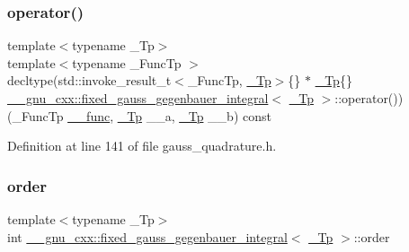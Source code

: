 \mbox{\label{struct____gnu__cxx_1_1fixed__gauss__gegenbauer__integral_a16f67fec7b9c704fa11076db362ca938}} 
\subsubsection{\texorpdfstring{operator()}{operator()}}
{\footnotesize\ttfamily template$<$typename \+\_\+\+Tp$>$ \\
template$<$typename \+\_\+\+Func\+Tp $>$ \\
decltype(std\+::invoke\+\_\+result\+\_\+t$<$\+\_\+\+Func\+Tp, \hyperlink{namespace____gnu__cxx_a3b19a9c800ca194374ef9172290f7d79}{\+\_\+\+Tp}$>$\{\} $\ast$ \hyperlink{namespace____gnu__cxx_a3b19a9c800ca194374ef9172290f7d79}{\+\_\+\+Tp}\{\} \hyperlink{struct____gnu__cxx_1_1fixed__gauss__gegenbauer__integral}{\+\_\+\+\_\+gnu\+\_\+cxx\+::fixed\+\_\+gauss\+\_\+gegenbauer\+\_\+integral}$<$ \hyperlink{namespace____gnu__cxx_a3b19a9c800ca194374ef9172290f7d79}{\+\_\+\+Tp} $>$\+::operator()) (\+\_\+\+Func\+Tp \hyperlink{namespace____gnu__cxx_af2b2f0c7a2ae72b922b1afefae5a65b2}{\+\_\+\+\_\+func}, \hyperlink{namespace____gnu__cxx_a3b19a9c800ca194374ef9172290f7d79}{\+\_\+\+Tp} \+\_\+\+\_\+a, \hyperlink{namespace____gnu__cxx_a3b19a9c800ca194374ef9172290f7d79}{\+\_\+\+Tp} \+\_\+\+\_\+b) const}



Definition at line 141 of file gauss\+\_\+quadrature.\+h.

\mbox{\label{struct____gnu__cxx_1_1fixed__gauss__gegenbauer__integral_ae0cf76d27bf84a9664b8fa94ad1037ea}} 
\subsubsection{\texorpdfstring{order}{order}}
{\footnotesize\ttfamily template$<$typename \+\_\+\+Tp$>$ \\
int \hyperlink{struct____gnu__cxx_1_1fixed__gauss__gegenbauer__integral}{\+\_\+\+\_\+gnu\+\_\+cxx\+::fixed\+\_\+gauss\+\_\+gegenbauer\+\_\+integral}$<$ \hyperlink{namespace____gnu__cxx_a3b19a9c800ca194374ef9172290f7d79}{\+\_\+\+Tp} $>$\+::order}



